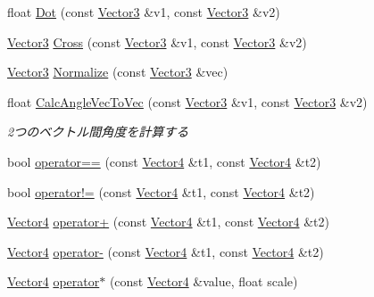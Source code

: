 \begin{DoxyCompactItemize}
\item 
float \mbox{\hyperlink{namespace_math_a1b728d3fd626ed55895d4b59575e071a}{Dot}} (const \mbox{\hyperlink{struct_math_1_1_vector3}{Vector3}} \&v1, const \mbox{\hyperlink{struct_math_1_1_vector3}{Vector3}} \&v2)
\item 
\mbox{\hyperlink{struct_math_1_1_vector3}{Vector3}} \mbox{\hyperlink{namespace_math_a3e7d67884adf533a55598952787420b2}{Cross}} (const \mbox{\hyperlink{struct_math_1_1_vector3}{Vector3}} \&v1, const \mbox{\hyperlink{struct_math_1_1_vector3}{Vector3}} \&v2)
\item 
\mbox{\hyperlink{struct_math_1_1_vector3}{Vector3}} \mbox{\hyperlink{namespace_math_ad4369be47f3ec66cce0862bc66966e96}{Normalize}} (const \mbox{\hyperlink{struct_math_1_1_vector3}{Vector3}} \&vec)
\item 
float \mbox{\hyperlink{namespace_math_ac1dbf09b73e7c8d4144887c802c66fdc}{Calc\+Angle\+Vec\+To\+Vec}} (const \mbox{\hyperlink{struct_math_1_1_vector3}{Vector3}} \&v1, const \mbox{\hyperlink{struct_math_1_1_vector3}{Vector3}} \&v2)
\begin{DoxyCompactList}\small\item\em 2つのベクトル間角度を計算する \end{DoxyCompactList}\item 
bool \mbox{\hyperlink{namespace_math_a63e6345cc66935721e93c8c65978eb7e}{operator==}} (const \mbox{\hyperlink{struct_math_1_1_vector4}{Vector4}} \&t1, const \mbox{\hyperlink{struct_math_1_1_vector4}{Vector4}} \&t2)
\item 
bool \mbox{\hyperlink{namespace_math_a363043a928db204744bfb86367be979d}{operator!=}} (const \mbox{\hyperlink{struct_math_1_1_vector4}{Vector4}} \&t1, const \mbox{\hyperlink{struct_math_1_1_vector4}{Vector4}} \&t2)
\item 
\mbox{\hyperlink{struct_math_1_1_vector4}{Vector4}} \mbox{\hyperlink{namespace_math_a62a5770bc56d8813435b7530021278b5}{operator+}} (const \mbox{\hyperlink{struct_math_1_1_vector4}{Vector4}} \&t1, const \mbox{\hyperlink{struct_math_1_1_vector4}{Vector4}} \&t2)
\item 
\mbox{\hyperlink{struct_math_1_1_vector4}{Vector4}} \mbox{\hyperlink{namespace_math_ae164bf95185127aeb0d140f15718e10a}{operator-\/}} (const \mbox{\hyperlink{struct_math_1_1_vector4}{Vector4}} \&t1, const \mbox{\hyperlink{struct_math_1_1_vector4}{Vector4}} \&t2)
\item 
\mbox{\hyperlink{struct_math_1_1_vector4}{Vector4}} \mbox{\hyperlink{namespace_math_a2c882069472ade27f2265b16041baf76}{operator$\ast$}} (const \mbox{\hyperlink{struct_math_1_1_vector4}{Vector4}} \&value, float scale)

\end{DoxyCompactItemize}
